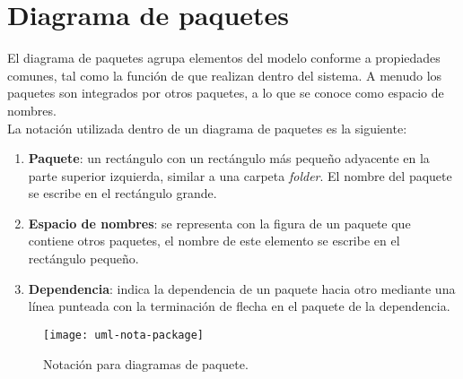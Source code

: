 \section{Diagrama de paquetes}\label{sec:uml-package}
El diagrama de paquetes agrupa elementos del modelo conforme a propiedades comunes, tal como la función de que realizan dentro del sistema. A menudo los paquetes son integrados por otros paquetes, a lo que se conoce como espacio de nombres\cite{UMLClassroom}.\\
La notación utilizada dentro de un diagrama de paquetes es la siguiente\cite{UMLClassroom, SoftwareEngineeringUML}:
\begin{enumerate}
   \item \textbf{Paquete}: un rectángulo con un rectángulo más pequeño adyacente en la parte superior izquierda, similar a una carpeta \textit{folder}. El nombre del paquete se escribe en el rectángulo grande.
   \item \textbf{Espacio de nombres}: se representa con la figura de un paquete que contiene otros paquetes, el nombre de este elemento se escribe en el rectángulo pequeño.
   \item \textbf{Dependencia}: indica la dependencia de un paquete hacia otro mediante una línea punteada con la terminación de flecha en el paquete de la dependencia.
\end{enumerate} 
\begin{figure}[h]
  \centering
  \texttt{[image: uml-nota-package]}
  \caption{Notación para diagramas de paquete\cite{SoftwareEngineeringUML}.}
  \label{fig:uml-nota-package}
\end{figure}

